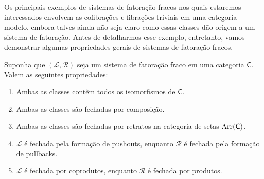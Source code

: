 Os principais exemplos de sistemas de fatoração fracos nos quais estaremos interessados envolvem as cofibrações e fibrações triviais em uma categoria modelo, embora talves ainda não seja claro como essas classes dão origem a um sistema de fatoração.
Antes de detalharmos esse exemplo, entretanto, vamos demonstrar algumas propriedades gerais de sistemas de fatoração fracos.

\begin{prop}\label{prop:propriedades_fatoracao_fraca}
  Suponha que $(\mathcal{L},\mathcal{R})$ seja um sistema de fatoração fraco em uma categoria $\mathsf{C}$.
  Valem as seguintes propriedades:
  \begin{enumerate}
  \item Ambas as classes contêm todos os isomorfismos de $\mathsf{C}$.
    
  \item Ambas as classes são fechadas por composição.
    
  \item Ambas as classes são fechadas por retratos na categoria de setas $\mathrm{Arr}(\mathsf{C})$.
    
  \item $\mathcal{L}$ é fechada pela formação de pushouts, enquanto $\mathcal{R}$ é fechada pela formação de pullbacks.
    
  \item $\mathcal{L}$ é fechada por coprodutos, enquanto $\mathcal{R}$ é fechada por produtos.
  \end{enumerate}
\end{prop}


